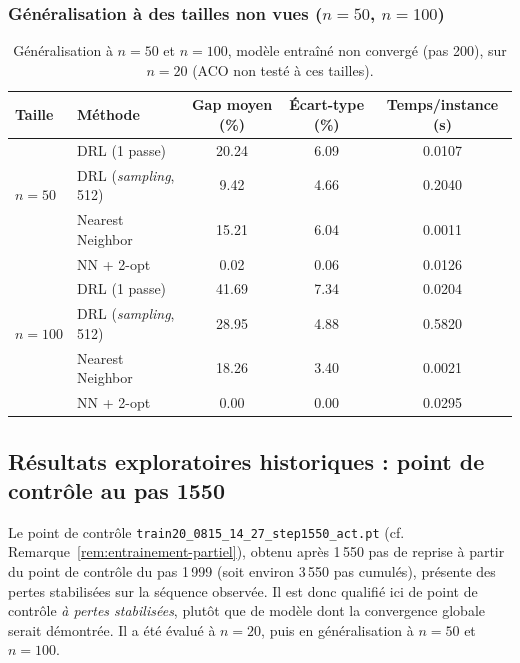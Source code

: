 \documentclass[12pt, a4paper, twoside, openright]{book}
\begin{document}
\subsubsection{Généralisation à des tailles non vues ($n=50$, $n=100$)}

\begin{table}[H]
	\centering
	\begin{tabular}{llccc}
		\toprule
		Taille & Méthode & Gap moyen (\%) & Écart-type (\%) & Temps/instance (s) \\
		\midrule
		\multirow{3}{*}{$n=50$}
		& DRL (1 passe)                & 20.24 & 6.09 & 0.0107 \\
		& DRL (\textit{sampling}, 512) & 9.42  & 4.66 & 0.2040 \\
		& Nearest Neighbor             & 15.21 & 6.04 & 0.0011 \\
		& NN + 2-opt                   & 0.02  & 0.06 & 0.0126 \\
		\midrule
		\multirow{3}{*}{$n=100$}
		& DRL (1 passe)                & 41.69 & 7.34 & 0.0204 \\
		& DRL (\textit{sampling}, 512) & 28.95 & 4.88 & 0.5820 \\
		& Nearest Neighbor             & 18.26 & 3.40 & 0.0021 \\
		& NN + 2-opt                   & 0.00  & 0.00 & 0.0295 \\
		\bottomrule
	\end{tabular}
	\caption{Généralisation à $n=50$ et $n=100$, modèle entraîné non convergé (pas 200), sur $n=20$ (ACO non testé à ces tailles).}
	\label{tab:resultats-generalisation}
\end{table}

\subsection{Résultats exploratoires historiques : point de contrôle au pas 1550}
\label{sec:res-step1550}

Le point de contrôle \texttt{train20\_0815\_14\_27\_step1550\_act.pt}
(cf. Remarque~\ref{rem:entrainement-partiel}), obtenu après 1\,550 pas de reprise
à partir du point de contrôle du pas 1\,999 (soit environ 3\,550 pas cumulés),
présente des pertes stabilisées sur la séquence observée. Il est donc qualifié ici
de point de contrôle \emph{à pertes stabilisées}, plutôt que de modèle dont la
convergence globale serait démontrée. Il a été évalué à $n=20$, puis en
généralisation à $n=50$ et $n=100$.
\end{document}
